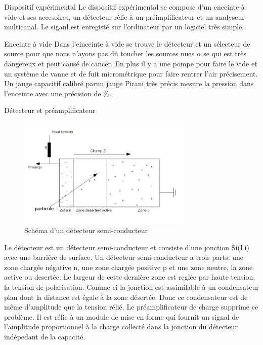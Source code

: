 \documentclass[a4paper,11pt]{scrartcl}
\begin{document}
 \begin{section}{Dispositif expérimental}
  Le dispositif expérimental se compose d'un enceinte à vide et ses accesoires, un détecteur rélie à un préimplificateur et un analyseur multicanal. Le siganl est enregisté sur l'ordinateur par un logiciel très simple.
  \begin{subsection}{Enceinte à vide}
   Dans l'einceinte à vide se trouve le détecteur et un sélecteur de source pour que nous n'ayons pas dû toucher les sources nues $\alpha$ se qui est très dangereux et peut causé de cancer. En plus il y a une pompe pour faire le vide et un système de vanne et de fuit micrométrique pour faire rentrer l'air précisement. Un jauge capacitif calibré parun jauge Pirani très précis mesure la pression dans l'enceinte avec une précision de \unit[0,2]{\%}.  
  \end{subsection}

  \begin{subsection}{Détecteur et préamplificateur}
\enlargethispage{1cm}
   \begin{figure}[hbt]
    \begin{center}
     \includegraphics[width=0.75\textwidth]{Bilder/detecteur.png}
    \end{center}
    \caption{Schéma d'un détecteur semi-conducteur}
   \end{figure}
   Le détecteur est un détecteur semi-conducteur et consiste d'une jonction Si(Li) avec une barrière de surface. Un détecteur semi-conducteur a trois parts: une zone chargée négative n, une zone chargée positive p  et une zone neutre, la zone active ou desertée. Le largeur de cette dernière zone est reglée par haute tension, la tension de polarisation. Comme ci la jonction est assimilable à un condensateur plan dont la distance est égale à la zone désertée. Donc ce condensateur est de même d'amplitude que la tension rélié.
   Le préamplificateur de charge supprime ce problème. Il est rélie à un module de mise en forme qui fournit un signal de l'amplitude proportionnel à la charge collecté dans la jonction du détecteur indépedant de la capacité.
  \end{subsection}


\end{section}
\end{document}
